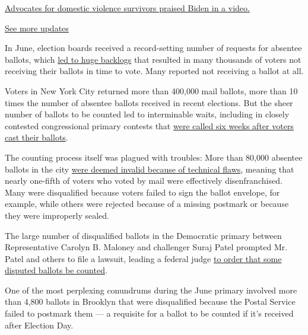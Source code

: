 \href{https://www.nytimes3xbfgragh.onion/live/2020/08/19/us/dnc-convention-election?action=click\&pgtype=Article\&state=default\&region=MAIN_CONTENT_1\&context=storylines_live_updates\#advocates-for-domestic-violence-survivors-praised-biden-in-a-video}{Advocates
for domestic violence survivors praised Biden in a video.}

\href{https://www.nytimes3xbfgragh.onion/live/2020/08/19/us/dnc-convention-election?action=click\&pgtype=Article\&state=default\&region=MAIN_CONTENT_1\&context=storylines_live_updates}{See
more updates}

In June, election boards received a record-setting number of requests
for absentee ballots, which
\href{https://www.nytimes3xbfgragh.onion/2020/08/03/nyregion/nyc-mail-ballots-voting.html}{led
to huge backlogs} that resulted in many thousands of voters not
receiving their ballots in time to vote. Many reported not receiving a
ballot at all.

Voters in New York City returned more than 400,000 mail ballots, more
than 10 times the number of absentee ballots received in recent
elections. But the sheer number of ballots to be counted led to
interminable waits, including in closely contested congressional primary
contests that
\href{https://www.nytimes3xbfgragh.onion/2020/08/04/nyregion/maloney-torres-ny-congressional-races.html}{were
called six weeks after voters cast their ballots}.

The counting process itself was plagued with troubles: More than 80,000
absentee ballots in the city
\href{https://nypost.com/2020/08/05/84000-mail-in-ballots-disqualified-in-nyc-primary-election/}{were
deemed invalid because of technical flaws}, meaning that nearly
one-fifth of voters who voted by mail were effectively disenfranchised.
Many were disqualified because voters failed to sign the ballot
envelope, for example, while others were rejected because of a missing
postmark or because they were improperly sealed.

The large number of disqualified ballots in the Democratic primary
between Representative Carolyn B. Maloney and challenger Suraj Patel
prompted Mr. Patel and others to file a lawsuit, leading a federal judge
\href{https://www.nytimes3xbfgragh.onion/2020/08/03/nyregion/nyc-congress-carolyn-maloney-ballots.html}{to
order that some disputed ballots be counted}.

One of the most perplexing conundrums during the June primary involved
more than 4,800 ballots in Brooklyn that were disqualified because the
Postal Service failed to postmark them --- a requisite for a ballot to
be counted if it's received after Election Day.

